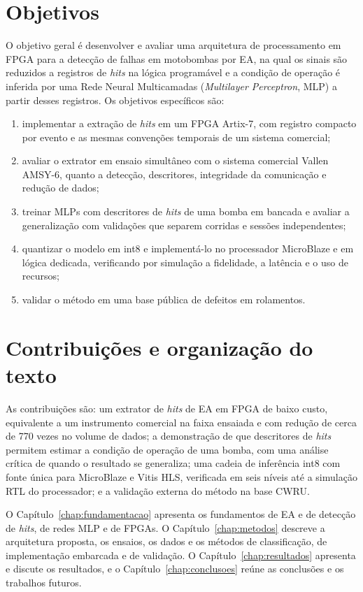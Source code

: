 \section{Objetivos}
\label{sec:objetivos}

O objetivo geral é desenvolver e avaliar uma arquitetura de processamento em FPGA para a detecção de falhas em motobombas por EA, na qual os sinais são reduzidos a registros de \textit{hits} na lógica programável e a condição de operação é inferida por uma Rede Neural Multicamadas (\textit{Multilayer Perceptron}, MLP) a partir desses registros. Os objetivos específicos são:
\begin{enumerate}[label=\textbf{\arabic*.}]
	\item implementar a extração de \textit{hits} em um FPGA Artix-7, com registro compacto por evento e as mesmas convenções temporais de um sistema comercial;
	\item avaliar o extrator em ensaio simultâneo com o sistema comercial Vallen AMSY-6, quanto a detecção, descritores, integridade da comunicação e redução de dados;
	\item treinar MLPs com descritores de \textit{hits} de uma bomba em bancada e avaliar a generalização com validações que separem corridas e sessões independentes;
	\item quantizar o modelo em int8 e implementá-lo no processador MicroBlaze e em lógica dedicada, verificando por simulação a fidelidade, a latência e o uso de recursos;
	\item validar o método em uma base pública de defeitos em rolamentos.
\end{enumerate}

\section{Contribuições e organização do texto}
\label{sec:contribuicoes}
\label{sec:organizacao}

As contribuições são: um extrator de \textit{hits} de EA em FPGA de baixo custo, equivalente a um instrumento comercial na faixa ensaiada e com redução de cerca de 770 vezes no volume de dados; a demonstração de que descritores de \textit{hits} permitem estimar a condição de operação de uma bomba, com uma análise crítica de quando o resultado se generaliza; uma cadeia de inferência int8 com fonte única para MicroBlaze e Vitis HLS, verificada em seis níveis até a simulação RTL do processador; e a validação externa do método na base CWRU.

O Capítulo~\ref{chap:fundamentacao} apresenta os fundamentos de EA e de detecção de \textit{hits}, de redes MLP e de FPGAs. O Capítulo~\ref{chap:metodos} descreve a arquitetura proposta, os ensaios, os dados e os métodos de classificação, de implementação embarcada e de validação. O Capítulo~\ref{chap:resultados} apresenta e discute os resultados, e o Capítulo~\ref{chap:conclusoes} reúne as conclusões e os trabalhos futuros.
